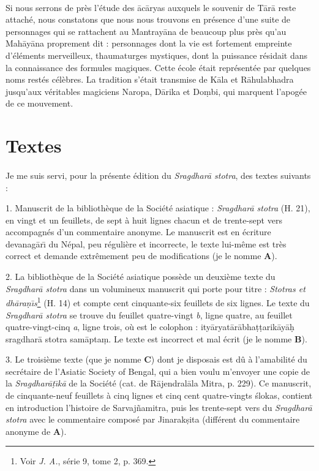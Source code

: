 \documentclass[a4paper, 11pt, oneside, french, landscape, twocolumn]{article}
\begin{document}
\paragraph{}
Si nous serrons de près l'étude des \={a}c\={a}ryas auxquels le souvenir de T\={a}r\={a} reste attaché, nous constatons que nous nous trouvons en présence d'une suite de personnages qui se rattachent au Mantray\={a}na de beaucoup plus près qu'au Mah\={a}y\={a}na proprement dit : personnages dont la vie est fortement empreinte d'éléments merveilleux, thaumaturges mystiques, dont la puissance résidait dans la connaissance des formules magiques. Cette école était représentée par quelques noms restés célèbres. La tradition s'était transmise de K\={a}la et R\={a}hulabhadra jusqu'aux véritables magiciens Naropa, D\={a}rika et Do\d{m}bi, qui marquent l'apogée de ce mouvement. 
\clearpage
\section{Textes}
\paragraph{}
Je me suis servi, pour la présente édition du \emph{Sragdhar\={a} stotra}, des textes suivants :

1. Manuscrit de la bibliothèque de la Société asiatique : \emph{Sragdhar\={a} stotra} (H. 21), en vingt et un feuillets, de sept à huit lignes chacun et de trente-sept vers accompagnés d'un commentaire anonyme. Le manuscrit est en écriture devanag\={a}r\={\i} du Népal, peu régulière et incorrecte, le texte lui-même est très correct et demande extrêmement peu de modifications (je le nomme \textbf{A}).

2. La bibliothèque de la Société asiatique possède un deuxième texte du \emph{Sragdhar\={a} stotra} dans un volumineux manuscrit qui porte pour titre : \emph{Stotras et dh\={a}ra\d{n}\={\i}s}\footnote{Voir \emph{J. A.}, série 9, tome 2, p. 369.} (H. 14) et compte cent cinquante-six feuillets de six lignes. Le texte du \emph{Sragdhar\={a} stotra} se trouve du feuillet quatre-vingt \emph{b}, ligne quatre, au feuillet quatre-vingt-cinq \emph{a}, ligne trois, où est le colophon : ity\={a}ryat\={a}r\={a}bha\d{t}\d{t}arik\={a}y\={a}\d{h} sragdhar\={a} stotra sam\={a}pta\d{m}. Le texte est incorrect et mal écrit (je le nomme \textbf{B}).

3. Le troisième texte (que je nomme \textbf{C}) dont je disposais est dû à l'amabilité du secrétaire de l'Asiatic Society of Bengal, qui a bien voulu m'envoyer une copie de la \emph{Sragdhar\={a}\d{t}\={\i}k\={a}} de la Société (cat. de R\={a}jendral\={a}la Mitra, p. 229). Ce manuscrit, de cinquante-neuf feuillets à cinq lignes et cinq cent quatre-vingts \'{s}lokas, contient en introduction l'histoire de Sarvaj\~{n}amitra, puis les trente-sept vers du \emph{Sragdhar\={a} stotra} avec le commentaire composé par Jinarak\d{s}ita (différent du commentaire anonyme de \textbf{A}).
\end{document}
